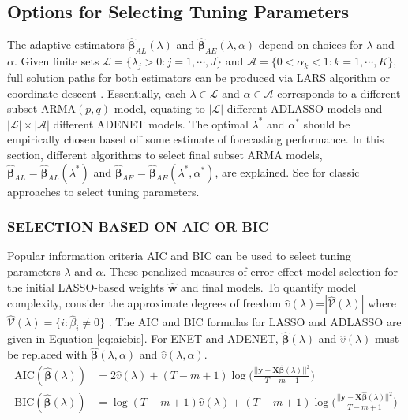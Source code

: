 \subsection{Options for Selecting Tuning Parameters}
The adaptive estimators $\hat{\bm{\beta}}_{AL} (\lambda)$ and $\hat{\bm{\beta}}_{AE} (\lambda,\alpha)$ depend on choices for $\lambda$ and $\alpha$. Given finite sets $\mathcal{L}=\{\lambda_j>0: j=1,\cdots,J\}$ and $\mathcal{A}=\{0<\alpha_k<1: k=1,\cdots,K\}$, full solution paths for both estimators can be produced via LARS algorithm \citep{Efron2004} or coordinate descent \citep{glmnet}. Essentially, each $\lambda\in\mathcal{L}$ and $\alpha\in\mathcal{A}$ corresponds to a different subset ARMA$(p,q)$ model, equating to $|\mathcal{L}|$ different ADLASSO models and $|\mathcal{L}|\times|\mathcal{A}|$ different ADENET models. The optimal $\lambda^*$ and $\alpha^*$ should be empirically chosen based off some estimate of forecasting performance. In this section, different algorithms to select final subset ARMA models, $\hat{\bm{\beta}}_{AL}=\hat{\bm{\beta}}_{AL}(\lambda^*)$ and $\hat{\bm{\beta}}_{AE}=\hat{\bm{\beta}}_{AE}(\lambda^*,\alpha^*)$, are explained. See \citet[pp. 241-254]{Hastie2009a} for classic approaches to select tuning parameters.

\subsubsection{SELECTION BASED ON AIC OR BIC}

Popular information criteria AIC and BIC can be used to select tuning parameters $\lambda$ and $\alpha$. These penalized measures of error effect model selection for the initial LASSO-based weights $\hat{\bm{w}}$ and final models. To quantify model complexity, consider the approximate degrees of freedom $\hat{v}(\lambda)$=$|\widehat{\mathcal{V}}(\lambda)|$ where $\widehat{\mathcal{V}}(\lambda)=\{i:\hat{\beta}_i\neq 0\}$ \citep{Zou2007}. The AIC and BIC formulas for LASSO and ADLASSO are given in Equation \ref{eq:aicbic}. For ENET and ADENET, $\hat{\bm{\beta}}(\lambda)$ and $\hat{v}(\lambda)$ must be replaced with $\hat{\bm{\beta}}(\lambda,\alpha)$ and $\hat{v}(\lambda,\alpha)$.
\begin{equation}
\label{eq:aicbic}
\begin{split}
\textrm{AIC}(\hat{\bm{\beta}}(\lambda))&=2\hat{v}(\lambda)+(T-m+1)\log\bigg(\frac{||\bm{y}-\bm{X}\hat{\bm{\beta}}(\lambda)||^2}{T-m+1}\bigg)\\
\textrm{BIC}(\hat{\bm{\beta}}(\lambda))&=\log(T-m+1)\hat{v}(\lambda)+(T-m+1)\log\bigg(\frac{||\bm{y}-\bm{X}\hat{\bm{\beta}}(\lambda)||^2}{T-m+1}\bigg)\\
\end{split}
\end{equation}

